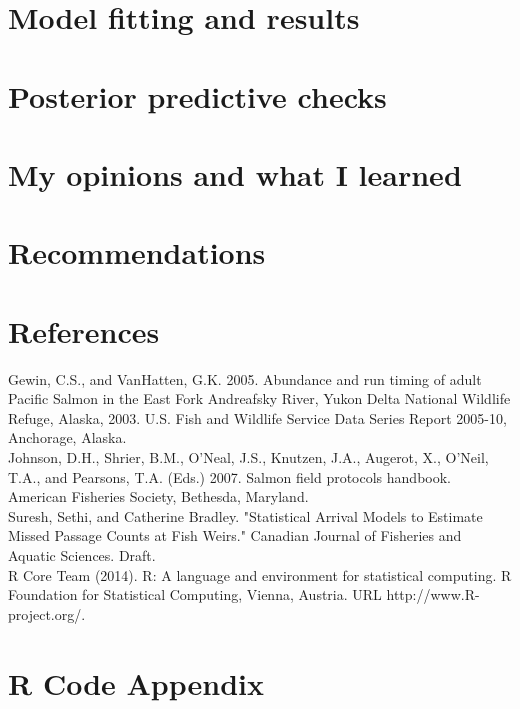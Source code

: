\documentclass[12pt]{article}\usepackage[]{graphicx}\usepackage[]{color}
\begin{document}
\section{Model fitting and results}







\section{Posterior predictive checks}

\section{My opinions and what I learned}

\section{Recommendations}



  



\section{References}


\noindent Gewin, C.S., and VanHatten, G.K. 2005. Abundance and run timing of adult Pacific Salmon in the East Fork Andreafsky River, Yukon Delta National Wildlife Refuge, Alaska, 2003. U.S. Fish and Wildlife Service Data Series Report 2005-10, Anchorage, Alaska. \\

\noindent Johnson, D.H., Shrier, B.M., O’Neal, J.S., Knutzen, J.A., Augerot, X., O’Neil, T.A., and Pearsons, T.A. (Eds.) 2007. Salmon field protocols handbook. American Fisheries Society, Bethesda, Maryland. \\

\noindent Suresh, Sethi, and Catherine Bradley. "Statistical Arrival Models to Estimate Missed Passage Counts at Fish Weirs." Canadian Journal of Fisheries and Aquatic Sciences. Draft. \\

\noindent   R Core Team (2014). R: A language and environment for statistical
computing. R Foundation for Statistical Computing, Vienna, Austria. URL
http://www.R-project.org/.\\

\section{R Code Appendix}
\end{document}
